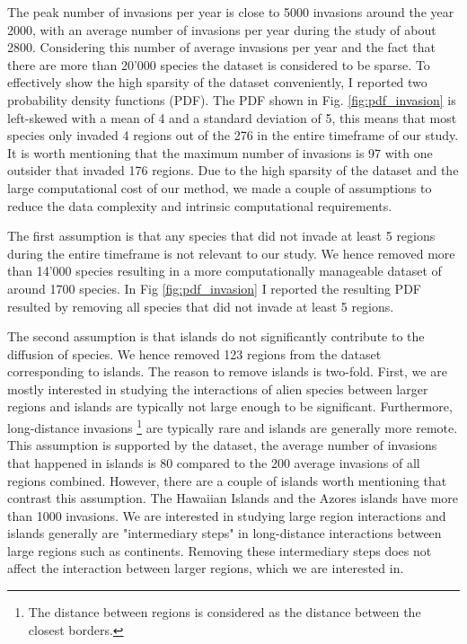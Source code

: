 \documentclass[mscthesis]{usiinfthesis}
\begin{document}
The peak number of invasions per year is close to 5000 invasions around the year 2000, with an average number of invasions per year during the study of about 2800. Considering this number of average invasions per year and the fact that there are more than 20'000 species the dataset is considered to be sparse. To effectively show the high sparsity of the dataset conveniently, I reported two probability density functions (PDF). The PDF shown in Fig. \ref{fig:pdf_invasion} is left-skewed with a mean of 4 and a standard deviation of 5, this means that most species only invaded 4 regions out of the 276 in the entire timeframe of our study. It is worth mentioning that the maximum number of invasions is 97 with one outsider that invaded 176 regions. Due to the high sparsity of the dataset and the large computational cost of our method, we made a couple of assumptions to reduce the data complexity and intrinsic computational requirements. 

The first assumption is that any species that did not invade at least 5 regions during the entire timeframe is not relevant to our study. We hence removed more than 14'000 species resulting in a more computationally manageable dataset of around 1700 species. In Fig \ref{fig:pdf_invasion} I reported the resulting PDF resulted by removing all species that did not invade at least 5 regions. 

The second assumption is that islands do not significantly contribute to the diffusion of species. We hence removed 123 regions from the dataset corresponding to islands. The reason to remove islands is two-fold. First, we are mostly interested in studying the interactions of alien species between larger regions and islands are typically not large enough to be significant. Furthermore, long-distance invasions \footnote{The distance between regions is considered as the distance between the closest borders.} are typically rare \cite{paper:lady} and islands are generally more remote. This assumption is supported by the dataset, the average number of invasions that happened in islands is 80 compared to the 200 average invasions of all regions combined. However, there are a couple of islands worth mentioning that contrast this assumption. The Hawaiian Islands and the Azores islands have more than 1000 invasions. We are interested in studying large region interactions and islands generally are "intermediary steps" in long-distance interactions between large regions such as continents. Removing these intermediary steps does not affect the interaction between larger regions, which we are interested in.
\end{document}
